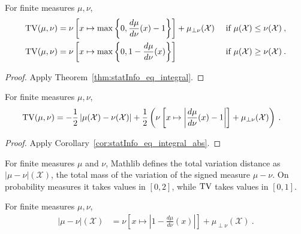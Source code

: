 \begin{lemma}
  \label{lem:tv_eq_integral}
  For finite measures $\mu, \nu$,
  \begin{align*}
  \operatorname{TV}(\mu, \nu)
  &= \nu\left[ x \mapsto \max \left\{0 , \frac{d \mu}{d\nu}(x) - 1 \right\} \right] + \mu_{\perp \nu}(\mathcal X) & \text{ if } \mu(\mathcal X) \le \nu(\mathcal X)
  \: , \\
  \operatorname{TV}(\mu, \nu)
  &= \nu\left[ x \mapsto \max \left\{0 , 1 - \frac{d \mu}{d\nu}(x) \right\} \right] & \text{ if } \mu(\mathcal X) \ge \nu(\mathcal X)
  \: .
  \end{align*}
\end{lemma}

\begin{proof}%
{}
Apply Theorem~\ref{thm:statInfo_eq_integral}.
\end{proof}


\begin{lemma}
  \label{lem:tv_eq_integral_abs}
  For finite measures $\mu, \nu$,
  \begin{align*}
  \operatorname{TV}(\mu, \nu)
  &= -\frac{1}{2} \left\vert \mu(\mathcal X) - \nu(\mathcal X)\right\vert + \frac{1}{2}\left( \nu\left[ x \mapsto \left\vert \frac{d \mu}{d\nu}(x) - 1 \right\vert \right]  + \mu_{\perp \nu}(\mathcal X)\right)
  \: .
  \end{align*}
\end{lemma}

\begin{proof}%
{}
Apply Corollary~\ref{cor:statInfo_eq_integral_abs}.
\end{proof}


\begin{definition}
  \label{def:tvDist}
  \mathlibok
  For finite measures $\mu$ and $\nu$, Mathlib defines the total variation distance as $\vert \mu - \nu \vert(\mathcal X)$, the total mass of the variation of the signed measure $\mu - \nu$.
  On probability measures it takes values in $[0, 2]$, while $\operatorname{TV}$ takes values in $[0, 1]$.
\end{definition}


\begin{lemma}
  \label{lem:tvDist_eq_integral_abs}
  \mathlibok
  For finite measures $\mu, \nu$,
  \begin{align*}
  \vert \mu - \nu \vert(\mathcal X)
  &= \nu\left[ x \mapsto \left\vert 1 - \frac{d \mu}{d\nu}(x) \right\vert \right] + \mu_{\perp \nu}(\mathcal X)
  \: .
  \end{align*}
\end{lemma}

